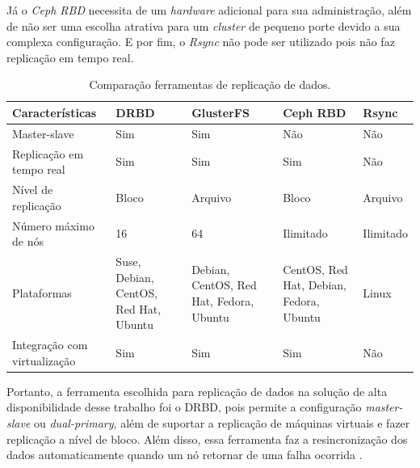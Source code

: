 Já o \textit{Ceph RBD} necessita de um \textit{hardware} adicional para sua administração, além de não ser uma escolha atrativa para um 
\textit{cluster} de pequeno porte devido a sua complexa configuração. 
E por fim, o \textit{Rsync} não pode ser utilizado pois não faz replicação em tempo real.

\begin{table}[h!]
\caption{Comparação ferramentas de replicação de dados.}
\label{tab:replicacao}
\begin{center}
\begin{tabular}{|l|p{2.7cm}|p{2.7cm}|p{2.7cm}|p{2cm}|}\hline
Características & DRBD & GlusterFS & Ceph RBD & Rsync\\\hline
Master-slave & Sim & Sim & Não & Não \\\hline
Replicação em tempo real & Sim & Sim & Sim & Não \\\hline
Nível de replicação & Bloco & Arquivo & Bloco & Arquivo \\\hline
Número máximo de nós & 16 & 64 & Ilimitado & Ilimitado \\\hline
Plataformas & Suse, Debian, CentOS, Red Hat, Ubuntu & Debian, CentOS, Red Hat, Fedora, Ubuntu & CentOS, Red Hat, Debian, Fedora, Ubuntu & Linux \\\hline
Integração com virtualização & Sim & Sim & Sim & Não \\\hline
\end{tabular}
\end{center}
\end{table}

Portanto, a ferramenta escolhida para replicação de dados na solução de alta disponibilidade desse trabalho foi o \ac{DRBD}, pois permite a 
configuração \textit{master-slave} ou \textit{dual-primary}, além de suportar a replicação de máquinas virtuais e fazer replicação a nível de bloco. Além disso, essa 
ferramenta faz a resincronização dos dados automaticamente quando um nó retornar de uma falha ocorrida \cite{drbd}.




